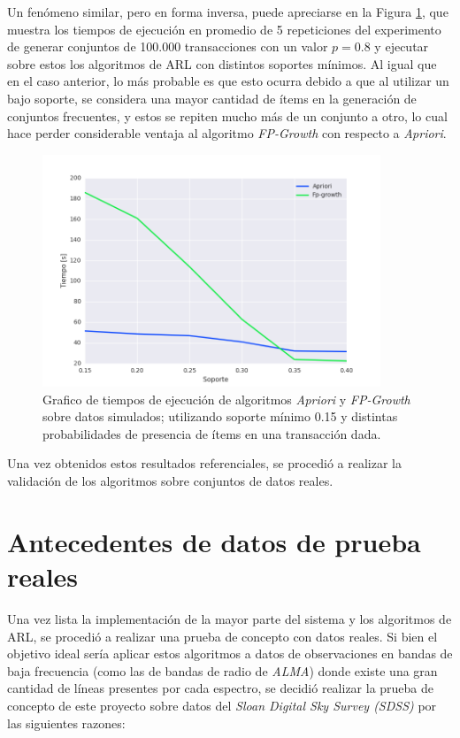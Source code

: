Un fenómeno similar, pero en forma inversa, puede apreciarse en la Figura \ref{fig:sim_02}, que muestra los tiempos de ejecución en promedio de 5 repeticiones del experimento de generar conjuntos de 100.000 transacciones con un valor $p = 0.8$ y ejecutar sobre estos los algoritmos de ARL con distintos soportes mínimos. Al igual que en el caso anterior, lo más probable es que esto ocurra debido a que al utilizar un bajo soporte, se considera una mayor cantidad de ítems en la generación de conjuntos frecuentes, y estos se repiten mucho más de un conjunto a otro, lo cual hace perder considerable ventaja al algoritmo \textit{FP-Growth} con respecto a \textit{Apriori}.

\begin{figure}[h!]
\begin{center}
\includegraphics[width=0.9\textwidth]{imagenes/sim_02.png}
\end{center}
\vspace*{-5mm}
\caption{Grafico de tiempos de ejecución de algoritmos \textit{Apriori} y \textit{FP-Growth} sobre datos simulados; utilizando soporte mínimo 0.15 y distintas probabilidades de presencia de ítems en una transacción dada.}
\label{fig:sim_02}
\end{figure}

Una vez obtenidos estos resultados referenciales, se procedió a realizar la validación de los algoritmos sobre conjuntos de datos reales.

\section{Antecedentes de datos de prueba reales}

Una vez lista la implementación de la mayor parte del sistema y los algoritmos de ARL, se procedió a realizar una prueba de concepto con datos reales. Si bien el objetivo ideal sería aplicar estos algoritmos a datos de observaciones en bandas de baja frecuencia (como las de bandas de radio de \textit{ALMA}) donde existe una gran cantidad de líneas presentes por cada espectro, se decidió realizar la prueba de concepto de este proyecto sobre datos del \textit{Sloan Digital Sky Survey (SDSS)} por las siguientes razones:

